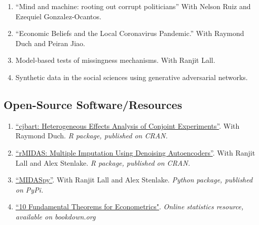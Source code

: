 \documentclass[11pt, a4paper]{article}
\begin{document}
\begin{enumerate}

\item ``Mind and machine: rooting out corrupt politicians'' With Nelson Ruiz and Ezequiel Gonzalez-Ocantos. 

\item ``Economic Beliefs and the Local Coronavirus Pandemic.'' With Raymond Duch and Peiran Jiao.

\item Model-based tests of missingness mechanisms. With Ranjit Lall.

\item Synthetic data in the social sciences using generative adversarial networks.


\end{enumerate}


\subsection*{Open-Source Software/Resources}

\begin{enumerate}

  \item \href{https://CRAN.R-project.org/package=cjbart}{``cjbart: Heterogeneous Effects Analysis of Conjoint Experiments''}. With Raymond Duch. \textit{R package, published on CRAN.}

  \item \href{https://CRAN.R-project.org/package=rMIDAS}{``rMIDAS: Multiple Imputation Using Denoising Autoencoders''}. With Ranjit Lall and Alex Stenlake. \textit{R package, published on CRAN.}

  \item \href{https://pypi.org/project/MIDASpy/}{``MIDASpy''}. With Ranjit Lall and Alex Stenlake. \textit{Python package, published on PyPi.}

  \item \href{https://bookdown.org/ts_robinson1994/10EconometricTheorems/}{``10 Fundamental Theorems for Econometrics"}. \textit{Online statistics resource, available on bookdown.org}

\end{enumerate}
\end{document}
